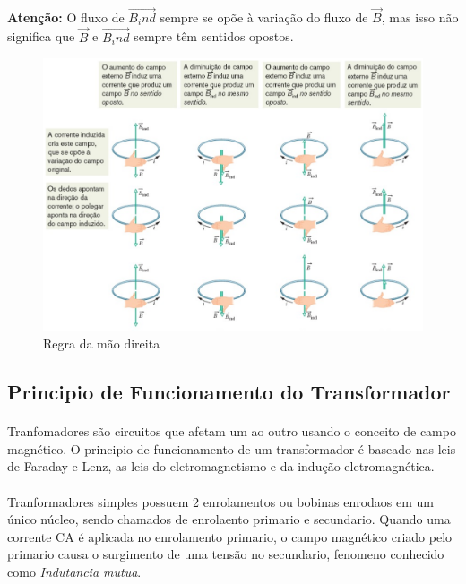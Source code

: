 \documentclass[a4paper, 12pt]{article}
\begin{document}
\paragraph{}\textbf{Atenção:} O fluxo de $\overrightarrow{B_ind}$ sempre se opõe à variação do fluxo de $\overrightarrow{B}$, mas isso não significa que $\overrightarrow{B}$ e $\overrightarrow{B_ind}$ sempre têm sentidos opostos. 
\\
\begin{figure}[h]
    \begin{center}
        \includegraphics[width=170mm]{novo.PNG}
    \end{center}
    \caption{Regra da mão direita}
    \label{Fig. Exemplo}
\end{figure}

    \newpage
    \subsection{Principio de Funcionamento do Transformador}
    \paragraph{}Tranfomadores são circuitos que afetam um ao outro usando o conceito de campo magnético. O principio de funcionamento de um transformador é baseado nas leis de Faraday e Lenz, as leis do eletromagnetismo e da indução eletromagnética.
\paragraph{}Tranformadores simples possuem 2 enrolamentos ou bobinas enrodaos em um único núcleo, sendo chamados de enrolaento primario e secundario. Quando uma corrente CA é aplicada no enrolamento primario, o campo magnético criado pelo primario causa o surgimento de uma tensão no secundario, fenomeno conhecido como \textit{Indutancia mutua}.
\end{document}
